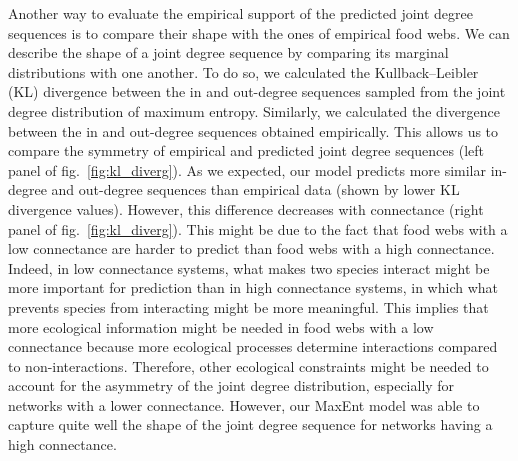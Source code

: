 \documentclass[11pt]{article}
\begin{document}
Another way to evaluate the empirical support of the predicted joint
degree sequences is to compare their shape with the ones of empirical
food webs. We can describe the shape of a joint degree sequence by
comparing its marginal distributions with one another. To do so, we
calculated the Kullback--Leibler (KL) divergence between the in and
out-degree sequences sampled from the joint degree distribution of
maximum entropy. Similarly, we calculated the divergence between the in
and out-degree sequences obtained empirically. This allows us to compare
the symmetry of empirical and predicted joint degree sequences (left
panel of fig.~\ref{fig:kl_diverg}). As we expected, our model predicts
more similar in-degree and out-degree sequences than empirical data
(shown by lower KL divergence values). However, this difference
decreases with connectance (right panel of fig.~\ref{fig:kl_diverg}).
This might be due to the fact that food webs with a low connectance are
harder to predict than food webs with a high connectance. Indeed, in low
connectance systems, what makes two species interact might be more
important for prediction than in high connectance systems, in which what
prevents species from interacting might be more meaningful. This implies
that more ecological information might be needed in food webs with a low
connectance because more ecological processes determine interactions
compared to non-interactions. Therefore, other ecological constraints
might be needed to account for the asymmetry of the joint degree
distribution, especially for networks with a lower connectance. However,
our MaxEnt model was able to capture quite well the shape of the joint
degree sequence for networks having a high connectance.
\end{document}
